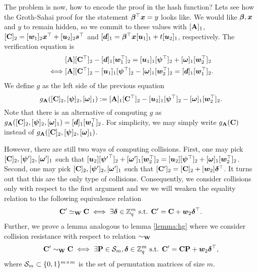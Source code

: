The problem is now, how to encode the proof in the hash function? Lets see how the Groth-Sahai proof for the statement ${\boldsymbol{\beta}}^\top{\boldsymbol{x}} = y$ looks like. We would like ${\boldsymbol{\beta}},{\boldsymbol{x}}$ and $y$ to remain hidden, so we commit to these values with $[\mathbf{{A}}]_1$, $[\mathbf{{C}}]_2 = [{\boldsymbol{w}}_1]_2{\boldsymbol{x}}^\top+[{\boldsymbol{u}}_2]_2{\boldsymbol{s}}^\top$ and $[{\boldsymbol{d}}]_1 = {\boldsymbol{\beta}}^\top{\boldsymbol{x}}[{\boldsymbol{u}}_1]_1+t[{\boldsymbol{u}}_2]_1$, respectively. The verification equation is
\begin{align}
&[\mathbf{{A}}][\mathbf{{C}}^\top]_2-[{\boldsymbol{d}}]_1[{\boldsymbol{w}}_1^\top]_2 = [{\boldsymbol{u}}_1]_1[{\boldsymbol{\psi}}^\top]_2+[{\boldsymbol{\omega}}]_1[{\boldsymbol{w}}_2^\top]_2 \label{eq:ver-betax=y}\\
\iff & [\mathbf{{A}}][\mathbf{{C}}^\top]_2 - [{\boldsymbol{u}}_1]_1[{\boldsymbol{\psi}}^\top]_2 - [{\boldsymbol{\omega}}]_1[{\boldsymbol{w}}_2^\top]_2 = [{\boldsymbol{d}}]_1[{\boldsymbol{w}}_1^\top]_2. \nonumber
\end{align}
We define $g$ as the left side of the previous equation
$$
g_{\mathbf{{A}}}([\mathbf{{C}}]_2,[{\boldsymbol{\psi}}]_2,[{\boldsymbol{\omega}}]_1):= [\mathbf{{A}}]_1[\mathbf{{C}}^\top]_2-[{\boldsymbol{u}}_2]_1[{\boldsymbol{\psi}}^\top]_2-[{\boldsymbol{\omega}}]_1[{\boldsymbol{w}}_2^\top]_2.
$$
Note that there is an alternative of computing $g$ as $g_{\mathbf{{A}}}([\mathbf{{C}}]_2,[{\boldsymbol{\psi}}]_2,[{\boldsymbol{\omega}}]_1)=[{\boldsymbol{d}}]_1[{\boldsymbol{w}}_1^\top]_2$. For simplicity, we may simply write $g_{\mathbf{{A}}}(\mathbf{{C}})$ instead of $g_{\mathbf{{A}}}([\mathbf{{C}}]_2,[{\boldsymbol{\psi}}]_2,[{\boldsymbol{\omega}}]_1)$.

However, there are still two ways of computing collisions. First, one may pick $[\mathbf{{C}}]_2,\allowbreak[{\boldsymbol{\psi}}']_2,[{\boldsymbol{\omega}}']_1$ such that $[{\boldsymbol{u}}_2][{{\boldsymbol{\psi}}'}^\top]_2+[{\boldsymbol{\omega}}']_1[{\boldsymbol{w}}_2^\top]_2=[{\boldsymbol{u}}_2][{\boldsymbol{\psi}}^\top]_2+[{\boldsymbol{\omega}}]_1[{\boldsymbol{w}}_2^\top]_2$. Second, one may pick $[\mathbf{{C}}]_2,[{\boldsymbol{\psi}}']_2,[{\boldsymbol{\omega}}']_1$ such that $[\mathbf{{C}}']_2 = [\mathbf{{C}}]_2 + [{\boldsymbol{w}}_2]{\boldsymbol{\delta}}^\top$. It turns out that this are the only type of collisions. Consequently, we consider collisions only with respect to the first argument and we we will weaken the equality relation to the following equivalence relation
$$
\mathbf{{C}}'\simeq_{\mathbf{{W}}} \mathbf{{C}} \iff \exists {\boldsymbol{\delta}}\in\mathbb{Z}_q^m \text{ s.t. } \mathbf{{C}}' = \mathbf{{C}}+{\boldsymbol{w}}_2{\boldsymbol{\delta}}^\top.
$$
Further, we prove a lemma analogous to lemma \ref{lemma:hg} where we consider collision resistance with respect to relation $\sim_{\mathbf{{W}}}$ 
$$
\mathbf{{C}}'\sim_{\mathbf{{W}}} \mathbf{{C}} \iff \exists \mathbf{{P}}\in\mathcal{S}_m, {\boldsymbol{\delta}}\in\mathbb{Z}_q^m \text{ s.t. } \mathbf{{C}}' = \mathbf{{C}}\mathbf{{P}}+{\boldsymbol{w}}_2{\boldsymbol{\delta}}^\top,
$$
where $\mathcal{S}_m\subset\{0,1\}^{m\times m}$ is the set of permutation matrices of size $m$.

